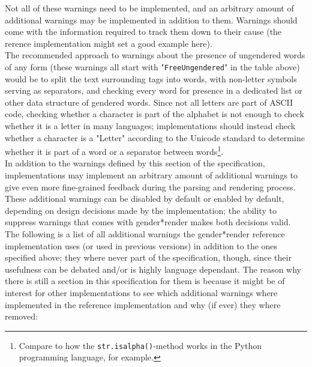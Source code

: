 \documentclass{article}
\newcommand{\GenderRender}{
    gender*render
}
\begin{document}

    Not all of these warnings need to be implemented, and an arbitrary amount of additional warnings may be implemented in addition to them.
    Warnings should come with the information required to track them down to their cause (the rerence implementation might set a good example here).\\

    The recommended approach to warnings about the presence of ungendered words of any form (these warnings all start with "\texttt{FreeUngendered}" in the table above) would be to split the text surrounding tags into words, with non-letter symbols serving as separators, and checking every word for presence in a dedicated list or other data structure of gendered words.
    Since not all letters are part of ASCII code, checking whether a character is part of the alphabet is not enough to check whether it is a letter in many languages;
    implementations should instead check whether a character is a "Letter" according to the Unicode standard to determine whether it is part of a word or a separator between words\footnote{Compare to how the \texttt{str.isalpha()}-method works in the Python programming language, for example.}.\\

    In addition to the warnings defined by this section of the specification, implementations may implement an arbitrary amount of additional warnings to give even more fine-grained feedback during the parsing and rendering process.
    These additional warnings can be disabled by default or enabled by default, depending on design decisions made by the implementation;
    the ability to suppress warnings that comes with \GenderRender makes both decisions valid.\\

    The following is a list of all additional warnings the \GenderRender reference implementation uses (or used in previous versions) in addition to the ones specified above;
    they where never part of the specification, though, since their usefulness can be debated and/or is highly language dependant.
    The reason why there is still a section in this specification for them is because it might be of interest for other implementations to see which additional warnings where implemented in the reference implementation and why (if ever) they where removed:\\
\end{document}
